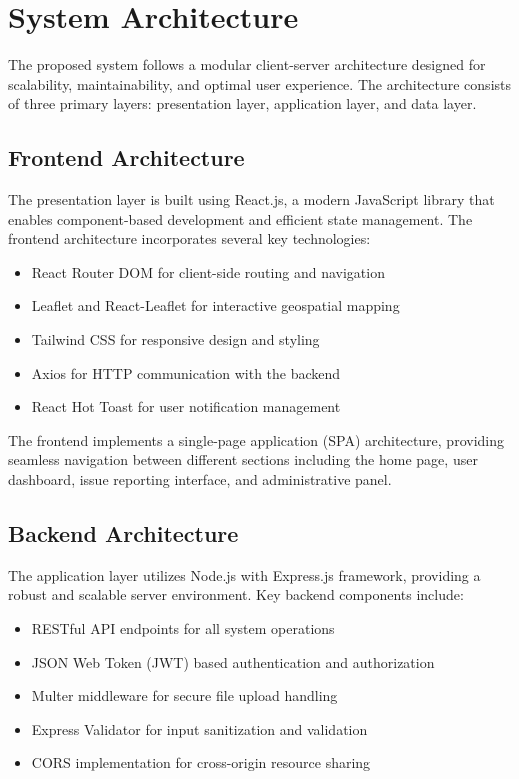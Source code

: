 \documentclass[journal,10pt,twocolumn]{IEEEtran}
\begin{document}
\section{System Architecture}
The proposed system follows a modular client-server architecture designed for scalability, maintainability, and optimal user experience. The architecture consists of three primary layers: presentation layer, application layer, and data layer.

\subsection{Frontend Architecture}
The presentation layer is built using React.js, a modern JavaScript library that enables component-based development and efficient state management. The frontend architecture incorporates several key technologies:

\begin{itemize}
\item React Router DOM for client-side routing and navigation
\item Leaflet and React-Leaflet for interactive geospatial mapping
\item Tailwind CSS for responsive design and styling
\item Axios for HTTP communication with the backend
\item React Hot Toast for user notification management
\end{itemize}

The frontend implements a single-page application (SPA) architecture, providing seamless navigation between different sections including the home page, user dashboard, issue reporting interface, and administrative panel.

\subsection{Backend Architecture}
The application layer utilizes Node.js with Express.js framework, providing a robust and scalable server environment. Key backend components include:

\begin{itemize}
\item RESTful API endpoints for all system operations
\item JSON Web Token (JWT) based authentication and authorization
\item Multer middleware for secure file upload handling
\item Express Validator for input sanitization and validation
\item CORS implementation for cross-origin resource sharing
\end{itemize}
\end{document}
